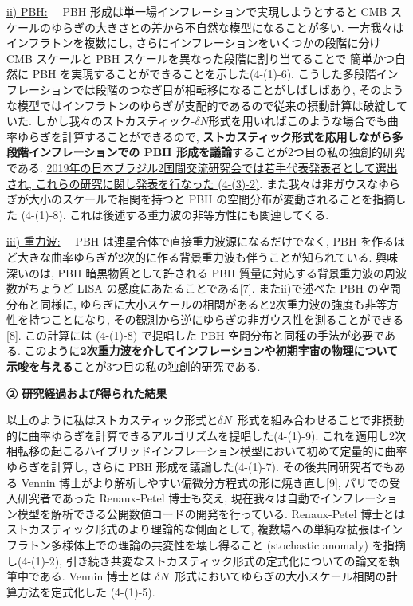 \documentclass[11pt,a4paper,uplatex,twoside,dvipdfmx]{ujarticle} 	%
\renewcommand{\emph}[1]{{\sffamily\gtfamily\bfseries #1}}
\newcommand{\subsubject}[1]{\noindent \ul{#1}~~}
\newcommand{\研究課題名}{\mgfamily ストカスティック形式、原始ブラックホール、重力波観測から迫るインフレーション}
\newcommand{\研究機関名}{\mgfamily 名古屋大学}
\newcommand{\申請者氏名}{\mgfamily 多田 祐一郎}
\newcommand{\研究代表者氏名}{\申請者氏名}
\newcommand{\研究期間の最終元号年度}{34}	%
\begin{document}
{	\vspace{3pt}
	\subsubject{ii) PBH:}
	PBH 形成は単一場インフレーションで実現しようとすると CMB スケールのゆらぎの大きさとの差から不自然な模型になることが多い.
	一方我々はインフラトンを複数にし, さらにインフレーションをいくつかの段階に分け CMB スケールと PBH スケールを異なった段階に割り当てることで
	簡単かつ自然に PBH を実現することができることを示した(4-(1)-6).
	こうした多段階インフレーションでは段階のつなぎ目が相転移になることがしばしばあり, そのような模型ではインフラトンのゆらぎが支配的であるので従来の摂動計算は破綻していた.
	しかし我々のストカスティック-$\delta N$形式を用いればこのような場合でも曲率ゆらぎを計算することができるので,
	\emph{ストカスティック形式を応用しながら多段階インフレーションでの PBH 形成を議論}することが2つ目の私の独創的研究である.
	\ul{2019年の日本ブラジル2国間交流研究会では若手代表発表者として選出され, これらの研究に関し発表を行なった (4-(3)-2)}.
	また我々は非ガウスなゆらぎが大小のスケールで相関を持つと PBH の空間分布が変動されることを指摘した (4-(1)-8).
	これは後述する重力波の非等方性にも関連してくる.
	
	
	\vspace{3pt}
	\subsubject{iii) 重力波:}
	PBH は連星合体で直接重力波源になるだけでなく, PBH を作るほど大きな曲率ゆらぎが2次的に作る背景重力波も伴うことが知られている.
	興味深いのは, PBH 暗黒物質として許される PBH 質量に対応する背景重力波の周波数がちょうど LISA の感度にあたることである[7].
	またii)で述べた PBH の空間分布と同様に, ゆらぎに大小スケールの相関があると2次重力波の強度も非等方性を持つことになり, その観測から逆にゆらぎの非ガウス性を測ることができる[8].
	この計算には (4-(1)-8) で提唱した PBH 空間分布と同種の手法が必要である.
	このように\emph{2次重力波を介してインフレーションや初期宇宙の物理について示唆を与える}ことが3つ目の私の独創的研究である.
	
	
	
	\begin{mdframed}[roundcorner=0.5zw,
	innertopmargin=0.8zw,innerbottommargin=0.8zw,
	linecolor=black!50,linewidth=0.2zw,
	backgroundcolor=black!10]
	{\bfseries\gtfamily\sffamily\large ② 研究経過および得られた結果}
	\end{mdframed}
	
	\vspace{-10pt}
	以上のように私はストカスティック形式と$\delta N$~形式を組み合わせることで非摂動的に曲率ゆらぎを計算できるアルゴリズムを提唱した(4-(1)-9).
	これを適用し2次相転移の起こるハイブリッドインフレーション模型において初めて定量的に曲率ゆらぎを計算し, さらに PBH 形成を議論した(4-(1)-7).
	その後共同研究者でもある Vennin 博士がより解析しやすい偏微分方程式の形に焼き直し[9],
	パリでの受入研究者であった Renaux-Petel 博士も交え, 現在我々は自動でインフレーション模型を解析できる公開数値コードの開発を行っている.
	Renaux-Petel 博士とはストカスティック形式のより理論的な側面として,
	複数場への単純な拡張はインフラトン多様体上での理論の共変性を壊し得ること (stochastic anomaly) を指摘し(4-(1)-2),
	引き続き共変なストカスティック形式の定式化についての論文を執筆中である.
	Vennin 博士とは $\delta N$~形式においてゆらぎの大小スケール相関の計算方法を定式化した (4-(1)-5).
	
}
\end{document}
